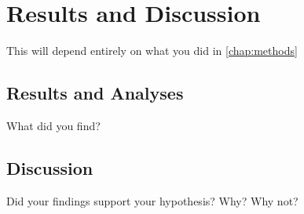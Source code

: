 \chapter{Results and Discussion}
\label{chap:res}

This will depend entirely on what you did in \ref{chap:methods}

\section{Results and Analyses}
What did you find?


\section{Discussion}

Did your findings support your hypothesis?
Why? Why not?